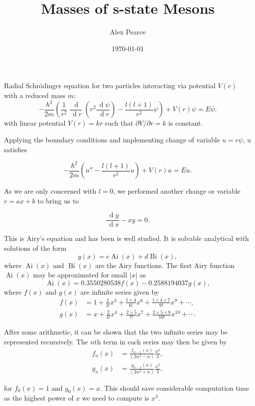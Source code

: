 \documentclass[]{article}
\renewcommand{\d}[1]{\ensuremath{\,\operatorname{d}\!{#1}}}
\renewcommand{\mod}[1]{\ensuremath{\lvert {#1} \rvert}}
\newcommand{\Ai}[1]{\ensuremath{\operatorname{Ai}({#1})}}
\newcommand{\Bi}[1]{\ensuremath{\operatorname{Bi}({#1})}}
\begin{document}
\title{Masses of s-state Mesons}
\author{Alex Pearce}
\date{\today}
\maketitle


\begin{abstract}
\end{abstract}

Radial Schr\"{o}dinger equation for two particles interacting via potential $V(r)$ with a reduced mass $m$:
\[
-\frac{\hbar^{2}}{2m}\left (
	\frac{1}{r^{2}} \frac{\d{}}{\d{r}} \left (
		r^{2} \frac{\d{\psi}}{\d{r}}
	\right )
	- \frac{l(l+1)}{r^{2}}\psi
\right )
+ V(r)\psi = E\psi.
\]
with linear potential $V(r) = kr$ such that $\partial V / \partial r = k$ is constant.

Applying the boundary conditions and implementing change of variable $u = r\psi$, u satisfies

\[
-\frac{\hbar^{2}}{2m}\left (
	u''
	- \frac{l(l+1)}{r^{2}}u
\right )
+ V(r)u = Eu.
\]

As we are only concerned with $l = 0$, we performed another change or variable $r = ax + b$ to bring us to

\[
\frac{\d{y}}{\d{x}} - xy = 0.
\]

This is Airy's equation and has been is well studied. It is solvable analytical with solutions of the form
\[
y(x) = c\Ai{x} + d\Bi{x},
\]
where $\Ai{x}$ and $\Bi{x}$ are the Airy functions. The first Airy function $\Ai{x}$ may be approximated for small $\mod{x}$ as
\[
\Ai{x} = 0.3550280538f(x) - 0.2588194037g(x),
\]
where $f(x)$ and $g(x)$ are infinite series given by
\begin{align*}
f(x) &= 1 + \frac{1}{3!}x^{3} + \frac{1\times4}{6!}x^{6} + \frac{1\times4\times{7}}{9!}x^{9} + \dotsb,\\
g(x) &= x + \frac{2}{4!}x^{4} + \frac{2\times5}{7!}x^{7} + \frac{2\times5\times{8}}{10!}x^{10} + \dotsb.
\end{align*}

After some arithmetic, it can be shown that the two infinite series may be represented recursively. The $n$th term in each series may then be given by
\begin{align*}
f_{n}(x) &= \frac{f_{n-1}(x)}{(3n^{2} - n)} \frac{x^{3}}{3},\\ 
g_{n}(x) &= \frac{g_{n-1}(x)}{(3n^{2} + n)} \frac{x^{3}}{3},
\end{align*}

for $f_{0}(x) = 1$ and $g_{0}(x) = x$. This should save considerable computation time as the highest power of $x$ we need to compute is $x^{3}$.
\end{document}
